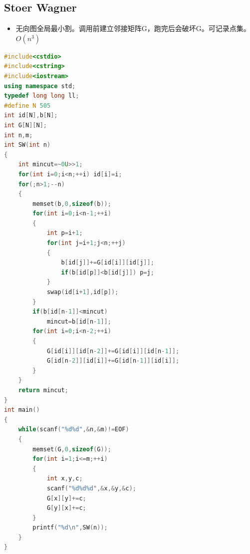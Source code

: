 \documentclass[UTF8,a4paper,titlepage]{ctexart}
\begin{document}
\subsection{Stoer Wagner}
\begin{itemize}
	\item 无向图全局最小割。调用前建立邻接矩阵G，跑完后会破坏G。可记录点集。$O(n^3)$
\end{itemize}

\begin{lstlisting}[language=C++]
#include<cstdio>
#include<cstring>
#include<iostream>
using namespace std;
typedef long long ll;
#define N 505
int id[N],b[N];
int G[N][N];
int n,m;
int SW(int n)
{
    int mincut=~0U>>1;
    for(int i=0;i<n;++i) id[i]=i;
    for(;n>1;--n)
    {
        memset(b,0,sizeof(b));
        for(int i=0;i<n-1;++i)
        {
            int p=i+1;
            for(int j=i+1;j<n;++j)
            {
                b[id[j]]+=G[id[i]][id[j]];
                if(b[id[p]]<b[id[j]]) p=j;
            }
            swap(id[i+1],id[p]);
        }
        if(b[id[n-1]]<mincut)
            mincut=b[id[n-1]];
        for(int i=0;i<n-2;++i)
        {
            G[id[i]][id[n-2]]+=G[id[i]][id[n-1]];
            G[id[n-2]][id[i]]+=G[id[n-1]][id[i]];
        }
    }
    return mincut;
}
int main()
{
    while(scanf("%d%d",&n,&m)!=EOF)
    {
        memset(G,0,sizeof(G));
        for(int i=1;i<=m;++i)
        {
            int x,y,c;
            scanf("%d%d%d",&x,&y,&c);
            G[x][y]+=c;
            G[y][x]+=c;
        }
        printf("%d\n",SW(n));
    }
}

 	\end{lstlisting}
\end{document}
